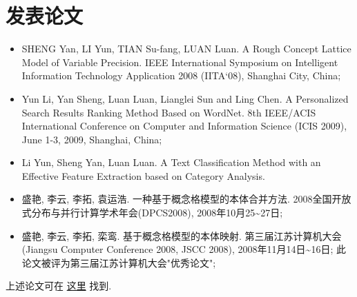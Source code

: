 \documentclass[a4paper,10pt,english]{manual}
\begin{document}
\section{发表论文}
\begin{itemize}
\item {} 
SHENG Yan, LI Yun, TIAN Su-fang, LUAN Luan. A Rough Concept Lattice Model of Variable Precision. IEEE International Symposium on Intelligent Information Technology Application 2008 (IITA`08), Shanghai City, China;

\item {} 
Yun Li, Yan Sheng, Luan Luan, Lianglei Sun and Ling Chen. A Personalized Search Results Ranking Method Based on WordNet. 8th IEEE/ACIS International Conference on Computer and Information Science (ICIS 2009), June 1-3, 2009, Shanghai, China; 

\item {} 
Li Yun, Sheng Yan, Luan Luan. A Text Classification Method with an Effective Feature Extraction based on Category Analysis. 

\item {} 
盛艳, 李云, 李拓, 袁运浩. 一种基于概念格模型的本体合并方法. 2008全国开放式分布与并行计算学术年会(DPCS2008), 2008年10月25\textasciitilde{}27日;

\item {} 
盛艳, 李云, 李拓, 栾鸾. 基于概念格模型的本体映射. 第三届江苏计算机大会(Jiangsu Computer Conference 2008, JSCC 2008), 2008年11月14日\textasciitilde{}16日; 此论文被评为第三届江苏计算机大会"优秀论文";

\end{itemize}

上述论文可在 \href{http://github.com/lizzie/lizworkspace/tree/cb82ad8d84a1b1a12df80e3508e3629abf09ac83/paper}{这里} 找到.
\end{document}
